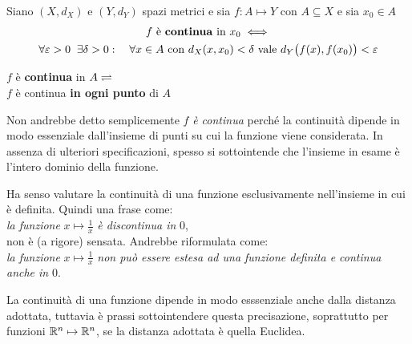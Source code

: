 \begin{definition}
	\label{def:funz_cont}
	Siano $(X,d_X)$ e $(Y,d_Y)$ spazi metrici e sia $f: A \mapsto Y$ con $A \subseteq X$ e sia $x_0 \in A$
	\begin{equation*}
		\begin{gathered}
			f \text{ è \textbf{continua} in } x_0 \iff\\
			\forall \varepsilon > 0\;\;\exists \delta > 0:\quad \forall x \in A \text{ con } d_X(x,x_0)<\delta \text{ vale } d_Y \bigl(f(x),f(x_0)\bigr) < \varepsilon
		\end{gathered}
	\end{equation*}

	\begin{center}
		$f$ è \textbf{continua} in $A\rightleftharpoons$\\
		$f$ è continua \textbf{in ogni punto} di $A$
	\end{center}
	\begin{note}
		Non andrebbe detto semplicemente $f$ \textit{è continua} perché la continuità dipende in modo essenziale dall'insieme di punti su cui la funzione viene considerata. In assenza di ulteriori specificazioni, spesso si sottointende che l'insieme in esame è l'intero dominio della funzione.
	\end{note}
	\begin{note}
		Ha senso valutare la continuità di una funzione esclusivamente nell'insieme in cui è definita. Quindi una frase come:\\
		\textit{la funzione} $x \mapsto \frac{1}{x}$ \textit{è discontinua in} $0$,\\
		non è (a rigore) sensata. Andrebbe riformulata come:\\
		\textit{la funzione} $x \mapsto \frac{1}{x}$ \textit{non può essere estesa ad una funzione definita e continua anche in} $0$.
	\end{note}
	\begin{note}
		La continuità di una funzione dipende in modo esssenziale anche dalla distanza adottata, tuttavia è prassi sottointendere questa precisazione, soprattutto per funzioni $\mathbb{R}^n \mapsto \mathbb{R}^n$, se la distanza adottata è quella Euclidea.
	\end{note}
\end{definition}


